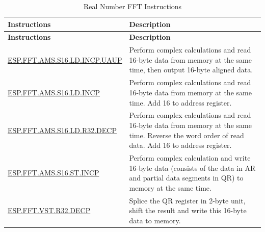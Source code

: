 \begin{longtable}[c]{|l|m{10cm}|}
    \caption{Real Number FFT Instructions}
    \label{tab:pie-real-fft-instructions}\\
    \hline
    \rowcolor{lightgray}
    \textbf{Instructions} & \textbf{Description} \\\hline
    \endfirsthead
    \rowcolor{lightgray}
    \textbf{Instructions} & \textbf{Description} \\\hline
    \endhead
    \endfoot
    
    \hyperref[instruction:ESPFFTAMSS16LDINCPUAUP]{ESP.FFT.AMS.S16.LD.INCP.UAUP} & Perform complex calculations and read 16-byte data from memory at the same time, then output 16-byte aligned data.
    \\\hline
    \hyperref[instruction:ESPFFTAMSS16LDINCP]{ESP.FFT.AMS.S16.LD.INCP} & Perform complex calculations and read 16-byte data from memory at the same time. Add 16 to address register.
    \\\hline
    \hyperref[instruction:ESPFFTAMSS16LDR32DECP]{ESP.FFT.AMS.S16.LD.R32.DECP} & Perform complex calculations and read 16-byte data from memory at the same time. Reverse the word order of read data. Add 16 to address register.
    \\\hline
    \hyperref[instruction:ESPFFTAMSS16STINCP]{ESP.FFT.AMS.S16.ST.INCP} & Perform complex calculation and write 16-byte data (consists of the data in AR and partial data segments in QR) to memory at the same time.
    \\\hline
    \hyperref[instruction:ESPFFTVSTR32DECP]{ESP.FFT.VST.R32.DECP} & Splice the QR register in 2-byte unit, shift the result and write this 16-byte data to memory.
    \\\hline
\end{longtable}